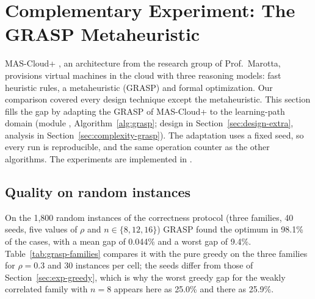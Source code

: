 \section{Complementary Experiment: The GRASP Metaheuristic}\label{sec:grasp}

MAS-Cloud+ \cite{mendes2022mascloud,mendes2024mascloud}, an architecture from the research group of Prof.\ Marotta, provisions virtual machines in the cloud with three reasoning models: fast heuristic rules, a metaheuristic (GRASP) and formal optimization. Our comparison covered every design technique except the metaheuristic. This section fills the gap by adapting the GRASP of MAS-Cloud+ to the learning-path domain (module , Algorithm~\ref{alg:grasp}; design in Section~\ref{sec:design-extra}, analysis in Section~\ref{sec:complexity-grasp}). The adaptation uses a fixed seed, so every run is reproducible, and the same operation counter as the other algorithms. The experiments are implemented in .

\subsection{Quality on random instances}

On the 1,800 random instances of the correctness protocol (three families, 40 seeds, five values of $\rho$ and $n\in\{8,12,16\}$) GRASP found the optimum in 98.1\% of the cases, with a mean gap of 0.044\% and a worst gap of 9.4\%. Table~\ref{tab:grasp-families} compares it with the pure greedy on the three families for $\rho=0.3$ and 30 instances per cell; the seeds differ from those of Section~\ref{sec:exp-greedy}, which is why the worst greedy gap for the weakly correlated family with $n=8$ appears here as 25.0\% and there as 25.9\%.

